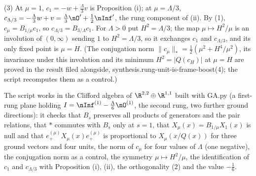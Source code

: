 (3) At $\mu = 1$, $c_{1} = -w + \tfrac{\Lambda}{3}v$ is Proposition (i); at $\mu = \Lambda/3$, $c_{\Lambda/3} = -\tfrac{\Lambda}{3}w + v = \tfrac{\Lambda}{3}\nO' + \tfrac12\nInf'$, the rung component of (ii). By (1), $c_{\mu} = B_{1/\mu}c_{1}$, so $c_{\Lambda/3} = B_{3/\Lambda}c_{1}$. For $\Lambda > 0$ put $H^{2} = \Lambda/3$; the map $\mu \mapsto H^{2}/\mu$ is an involution of $(0, \infty)$ sending $1$ to $H^{2} = \Lambda/3$, so it exchanges $c_{1}$ and $c_{\Lambda/3}$, and its only fixed point is $\mu = H$. (The conjugation norm $\|c_{\mu}\|_{*} = \tfrac12(\mu^{2} + H^{4}/\mu^{2})$, its invariance under this involution and its minimum $H^{2} = |Q(c_{H})|$ at $\mu = H$ are proved in the result filed alongside, synthesis.rung-unit-is-frame-boost(4); the script recomputes them as a control.)

The script works in the Clifford algebra of $\R^{2,2}\oplus\R^{1,1}$ built with GA.py (a first-rung plane holding $I = \nInf^{(1)} - \tfrac{\Lambda}{6}\nO^{(1)}$, the second rung, two further ground directions): it checks that $B_{s}$ preserves all products of generators and the pair relations, that $*$ commutes with $B_{s}$ only at $s = 1$, that $X_{\mu}(x) = B_{1/\mu}X_{1}(x)$ is null and that $e_{+}^{(\mu)}X_{\mu}(x)e_{+}^{(\mu)}$ is proportional to $X_{\mu}(x/Q(x))$ for three ground vectors and four units, the norm of $c_{\mu}$ for four values of $\Lambda$ (one negative), the conjugation norm as a control, the symmetry $\mu \mapsto H^{2}/\mu$, the identification of $c_{1}$ and $c_{\Lambda/3}$ with Proposition (i), (ii), the orthogonality (2) and the value $-\tfrac16$.
